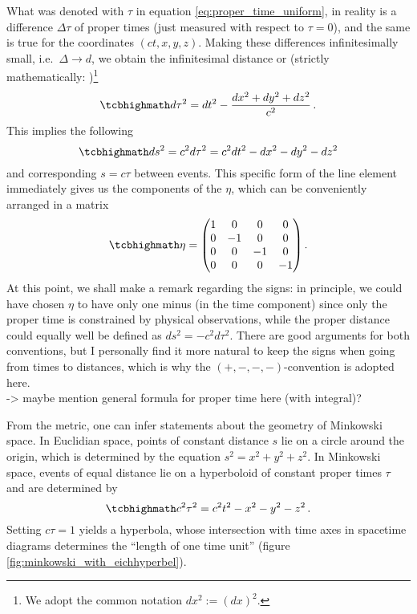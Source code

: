 What was denoted with $\tau$ in equation \eqref{eq:proper_time_uniform}, in reality is a difference $\Delta \tau$ of proper times (just measured with respect to $\tau = 0$), and the same is true for the coordinates $(ct, x, y, z)$. Making these differences infinitesimally small, i.e.~$\Delta \rightarrow d$, we obtain the infinitesimal distance or  (strictly mathematically: )\footnote{We adopt the common notation $dx^2 := (dx)^2$.}
\begin{equation}
\eqbox{
d\tau^2 = dt^2 - \frac{dx^2 + dy^2 + dz^2}{c^2}
} \, .
\end{equation}
This implies the following 
\begin{equation}
\eqbox{
ds^2 = c^2 d\tau^2 = c^2 dt^2 - dx^2 - dy^2 - dz^2
}
\end{equation}
and corresponding  $s = c \tau$ between events. This specific form of the line element immediately gives us the components of the  $\eta$, which can be conveniently arranged in a matrix
\begin{equation}
\eqbox{
\eta = \mqty(1 & 0 & 0 & 0 \\ 0 & -1 & 0 & 0 \\ 0 & 0 & -1 & 0 \\ 0 & 0 & 0 & -1)
} \, .
\end{equation}
At this point, we shall make a remark regarding the signs: in principle, we could have chosen $\eta$ to have only one minus (in the time component) since only the proper time is constrained by physical observations, while the proper distance could equally well be defined as $ds^2 = - c^2 d\tau^2$. There are good arguments for both conventions, but I personally find it more natural to keep the signs when going from times to distances, which is why the $(+, -, -, -)$-convention is adopted here.\\


-> maybe mention general formula for proper time here (with integral)?


From the metric, one can infer statements about the geometry of Minkowski space. In Euclidian space, points of constant distance $s$ lie on a circle around the origin, which is determined by the equation $s^2 = x^2 + y^2 + z^2$. In Minkowski space, events of equal distance lie on a hyperboloid of constant proper times $\tau$ and are determined by
\begin{equation}\label{eq:eichhyperbel}
\eqbox{
c^2 \tau^2 = c^2 t^2 - x^2 - y^2 - z^2
} \, .
\end{equation}
Setting $c \tau = 1$ yields a hyperbola, whose intersection with time axes in spacetime diagrams determines the \enquote{length of one time unit} (figure \ref{fig:minkowski_with_eichhyperbel}).


